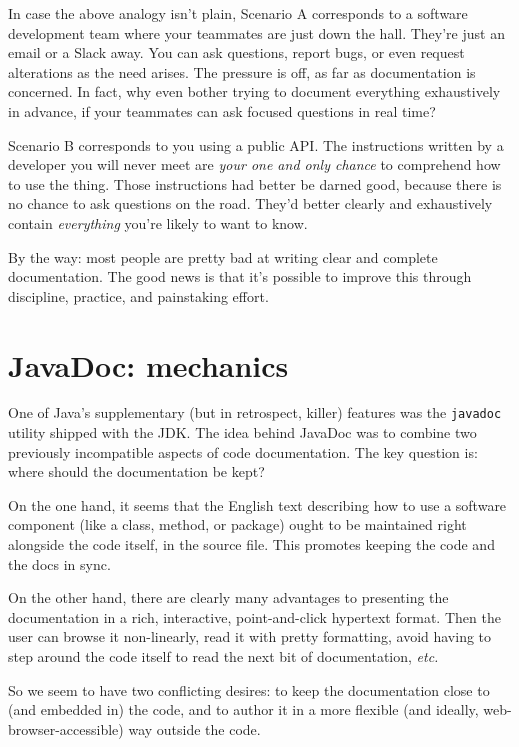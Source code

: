 In case the above analogy isn't plain, Scenario A corresponds to a software
development team where your teammates are just down the hall. They're just an
email or a Slack away. You can ask questions, report bugs, or even request
alterations as the need arises. The pressure is off, as far as documentation
is concerned. In fact, why even bother trying to document everything
exhaustively in advance, if your teammates can ask focused questions in real
time?

Scenario B corresponds to you using a public API. The instructions written by
a developer you will never meet are \textit{your one and only chance} to
comprehend how to use the thing. Those instructions had better be darned good,
because there is no chance to ask questions on the road. They'd better clearly
and exhaustively contain \textit{everything} you're likely to want to know.

By the way: most people are pretty bad at writing clear and complete
documentation. The good news is that it's possible to improve this through
discipline, practice, and painstaking effort.

\section{JavaDoc: mechanics}

One of Java's supplementary (but in retrospect, killer) features was the
\texttt{javadoc} utility shipped with the JDK. The idea behind JavaDoc was to
combine two previously incompatible aspects of code documentation. The key
question is: where should the documentation be kept?

On the one hand, it seems that the English text describing how to use a
software component (like a class, method, or package) ought to be maintained
right alongside the code itself, in the source file. This promotes keeping the
code and the docs in sync.

On the other hand, there are clearly many advantages to presenting the
documentation in a rich, interactive, point-and-click hypertext format. Then
the user can browse it non-linearly, read it with pretty formatting, avoid
having to step around the code itself to read the next bit of documentation,
\textit{etc.} 

So we seem to have two conflicting desires: to keep the documentation close to
(and embedded in) the code, and to author it in a more flexible (and ideally,
web-browser-accessible) way outside the code.

